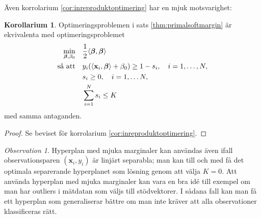 \documentclass[a4paper, 12pt]{report}
\theoremstyle{definition}
\newtheorem{cor}[thm]{Korollarium}
\theoremstyle{remark}
\newtheorem*{rem}{Observation}
\newcommand{\bfbeta}{{\boldsymbol{\beta}}}
\begin{document}
Även korrolarium \ref{cor:inreproduktoptimering} har en mjuk motsvarighet:
\begin{cor}\label{cor:mjukinreproduktoptimering}
	Optimeringsproblemen i sats \ref{thm:primalsoftmargin} är ekvivalenta med optimeringsproblemet
	\begin{equation*}
	\begin{aligned}
	\operatornamewithlimits{min}_{\bfbeta,\beta_0} & & &\frac{1}{2}\langle \bfbeta, \bfbeta \rangle\\
	\text{så att} & & &y_i(\langle \mathbf{x}_i,\bfbeta\rangle+\beta_0)\geq 1 - s_i,\quad i=1,\dots,N,\\
	& & &s_i\geq0,\quad i=1,\dots N,\\
	& & &\sum_{i=1}^{N} s_i \leq K
	\end{aligned}
	\end{equation*}
	med samma antaganden.
\end{cor}
\begin{proof}
	Se beviset för korrolarium \ref{cor:inreproduktoptimering}.
\end{proof}

\begin{rem}
	Hyperplan med mjuka marginaler kan användas även ifall observationsparen $\left(\mathbf{x}_i,y_i\right)$ är linjärt separabla; man kan till och med få det optimala separerande hyperplanet som lösning genom att välja $K=0$. Att använda hyperplan med mjuka marginaler kan vara en bra idé till exempel om man har outliers i mätdatan som väljs till stödvektorer. I sådana fall kan man få ett hyperplan som generaliserar bättre om man inte kräver att alla observationer klassificeras rätt.
\end{rem}
\end{document}
